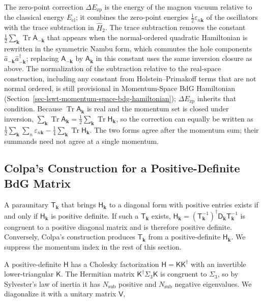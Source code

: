 The zero-point correction \(\Delta E_{\mathrm{zp}}\) is the energy of the magnon vacuum relative to the classical energy \(E_{\mathrm{cl}}\); it combines the zero-point energies \(\frac12\varepsilon_{n\mathbf k}\) of the oscillators with the trace subtraction in \(\hat H_2\). The trace subtraction removes the constant \(\frac12\sum_{\mathbf k}\operatorname{Tr}\mathsf A_{-\mathbf k}\) that appears when the normal-ordered quadratic Hamiltonian is rewritten in the symmetric Nambu form, which commutes the hole components \(\hat a_{-\mathbf k}\hat a_{-\mathbf k}^\dagger\); replacing \(\mathsf A_{-\mathbf k}\) by \(\mathsf A_{\mathbf k}\) in this constant uses the same inversion closure as above. The normalization of the subtraction relative to the real-space construction, including any constant from Holstein--Primakoff terms that are not normal ordered, is still provisional in Momentum-Space BdG Hamiltonian (Section~\ref{sec-lswt-momentum-space-bdg-hamiltonian}); \(\Delta E_{\mathrm{zp}}\) inherits that condition. Because \(\operatorname{Tr}\mathsf A_{\mathbf k}\) is real and the momentum set is closed under inversion, \(\sum_{\mathbf k}\operatorname{Tr}\mathsf A_{\mathbf k}=\frac12\sum_{\mathbf k}\operatorname{Tr}\mathsf H_{\mathbf k}\), so the correction can equally be written as \(\frac12\sum_{\mathbf k}\sum_n\varepsilon_{n\mathbf k}-\frac14\sum_{\mathbf k}\operatorname{Tr}\mathsf H_{\mathbf k}\). The two forms agree after the momentum sum; their summands need not agree at a single momentum.

\subsection{Colpa's Construction for a Positive-Definite BdG Matrix}

A paraunitary \(\mathsf T_{\mathbf k}\) that brings \(\mathsf H_{\mathbf k}\) to a diagonal form with positive entries exists if and only if \(\mathsf H_{\mathbf k}\) is positive definite. If such a \(\mathsf T_{\mathbf k}\) exists, \(\mathsf H_{\mathbf k}=(\mathsf T_{\mathbf k}^{-1})^\dagger\mathsf D_{\mathbf k}\mathsf T_{\mathbf k}^{-1}\) is congruent to a positive diagonal matrix and is therefore positive definite. Conversely, Colpa's construction produces \(\mathsf T_{\mathbf k}\) from a positive-definite \(\mathsf H_{\mathbf k}\). We suppress the momentum index in the rest of this section.

A positive-definite \(\mathsf H\) has a Cholesky factorization \(\mathsf H=\mathsf K\mathsf K^\dagger\) with an invertible lower-triangular \(\mathsf K\). The Hermitian matrix \(\mathsf K^\dagger\Sigma_3\mathsf K\) is congruent to \(\Sigma_3\), so by Sylvester's law of inertia it has \(N_{\mathrm{sub}}\) positive and \(N_{\mathrm{sub}}\) negative eigenvalues. We diagonalize it with a unitary matrix \(\mathsf V\),

